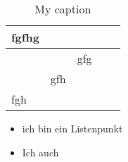 \begin{wraptable}{o}{0.5\textwidth}
\caption{My caption}
\label{my-new-label}
\begin{tabular}{|l|l|l|l|l|}
\hline
fgfhg &     &     &  &  \\ \hline
      &     & gfg &  &  \\ \hline
      & gfh &     &  &  \\ \hline
fgh   &     &     &  &  \\ \hline
\end{tabular}
\end{wraptable}
\blindtext[2]
\begin{itemize}
\item ich bin ein Listenpunkt
\item Ich auch
\end{itemize}